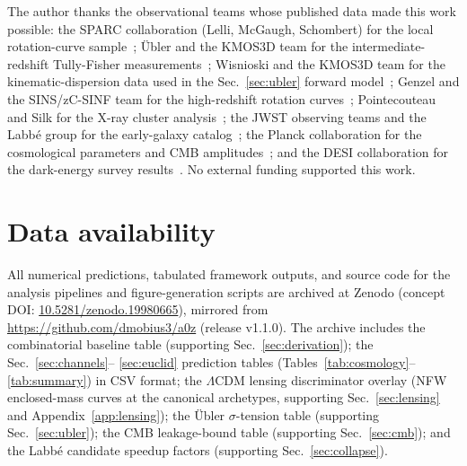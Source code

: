 \documentclass[
    aps,
    prd,
    reprint,
    superscriptaddress,
    nofootinbib,
    floatfix
]{revtex4-2}
\begin{document}
\begin{acknowledgments}

The author thanks the observational teams whose published data made
this work possible: the SPARC collaboration (Lelli, McGaugh,
Schombert) for the local rotation-curve sample~\cite{Lelli2016,
McGaugh2016RAR}; \"Ubler and the KMOS3D team for the
intermediate-redshift Tully-Fisher measurements~\cite{Ubler2017};
Wisnioski and the KMOS3D team for the kinematic-dispersion data used
in the Sec.~\ref{sec:ubler} forward model~\cite{Wisnioski2015};
Genzel and the SINS/zC-SINF team for the high-redshift rotation
curves~\cite{Genzel2017}; Pointecouteau and Silk for the X-ray
cluster analysis~\cite{PointecouteauSilk2005}; the JWST observing
teams and the Labb\'e group for the early-galaxy
catalog~\cite{Labbe2023}; the Planck collaboration for the
cosmological parameters and CMB amplitudes~\cite{Planck2018}; and
the DESI collaboration for the dark-energy survey
results~\cite{DESI2025}. No external funding supported this work.

\end{acknowledgments}

\section*{Data availability}

All numerical predictions, tabulated framework outputs, and source
code for the analysis pipelines and figure-generation scripts are
archived at Zenodo (concept DOI:
\href{https://doi.org/10.5281/zenodo.19980665}{10.5281/zenodo.19980665}),
mirrored from \url{https://github.com/dmobius3/a0z} (release v1.1.0).
The archive includes the combinatorial baseline table (supporting
Sec.~\ref{sec:derivation}); the Sec.~\ref{sec:channels}--%
\ref{sec:euclid} prediction tables (Tables~\ref{tab:cosmology}--%
\ref{tab:summary}) in CSV format; the $\Lambda$CDM lensing
discriminator overlay (NFW enclosed-mass curves at the canonical
archetypes, supporting Sec.~\ref{sec:lensing} and
Appendix~\ref{app:lensing}); the \"Ubler $\sigma$-tension table
(supporting Sec.~\ref{sec:ubler}); the CMB leakage-bound table
(supporting Sec.~\ref{sec:cmb}); and the Labb\'e candidate speedup
factors (supporting Sec.~\ref{sec:collapse}).
\end{document}

